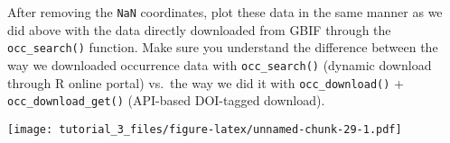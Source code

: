 \documentclass[]{article}
\begin{document}
After removing the \texttt{NaN} coordinates, plot these data in the same
manner as we did above with the data directly downloaded from GBIF
through the \texttt{occ\_search()} function. Make sure you understand
the difference between the way we downloaded occurrence data with
\texttt{occ\_search()} (dynamic download through R online portal)
vs.~the way we did it with \texttt{occ\_download()} +
\texttt{occ\_download\_get()} (API-based DOI-tagged download).

\texttt{[image: tutorial\_3\_files/figure-latex/unnamed-chunk-29-1.pdf]}
\end{document}
